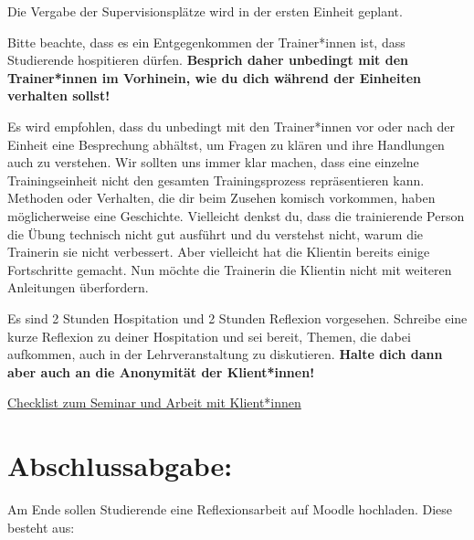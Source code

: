 \documentclass[
  letterpaper,
  DIV=11,
  numbers=noendperiod]{scrreprt}
\begin{document}
Die Vergabe der Supervisionsplätze wird in der ersten Einheit geplant.

Bitte beachte, dass es ein Entgegenkommen der Trainer*innen ist, dass
Studierende hospitieren dürfen. \textbf{Besprich daher unbedingt mit den
Trainer*innen im Vorhinein, wie du dich während der Einheiten verhalten
sollst!}

Es wird empfohlen, dass du unbedingt mit den Trainer*innen vor oder nach
der Einheit eine Besprechung abhältst, um Fragen zu klären und ihre
Handlungen auch zu verstehen. Wir sollten uns immer klar machen, dass
eine einzelne Trainingseinheit nicht den gesamten Trainingsprozess
repräsentieren kann. Methoden oder Verhalten, die dir beim Zusehen
komisch vorkommen, haben möglicherweise eine Geschichte. Vielleicht
denkst du, dass die trainierende Person die Übung technisch nicht gut
ausführt und du verstehst nicht, warum die Trainerin sie nicht
verbessert. Aber vielleicht hat die Klientin bereits einige Fortschritte
gemacht. Nun möchte die Trainerin die Klientin nicht mit weiteren
Anleitungen überfordern.

Es sind 2 Stunden Hospitation und 2 Stunden Reflexion vorgesehen.
Schreibe eine kurze Reflexion zu deiner Hospitation und sei bereit,
Themen, die dabei aufkommen, auch in der Lehrveranstaltung zu
diskutieren. \textbf{Halte dich dann aber auch an die Anonymität der
Klient*innen!}

\href{Intro_files/Checklisten.xlsx}{Checklist zum Seminar und Arbeit mit
Klient*innen}

\section{Abschlussabgabe:}\label{sec-abschlussabgabe}

Am Ende sollen Studierende eine Reflexionsarbeit auf Moodle hochladen.
Diese besteht aus:
\end{document}
